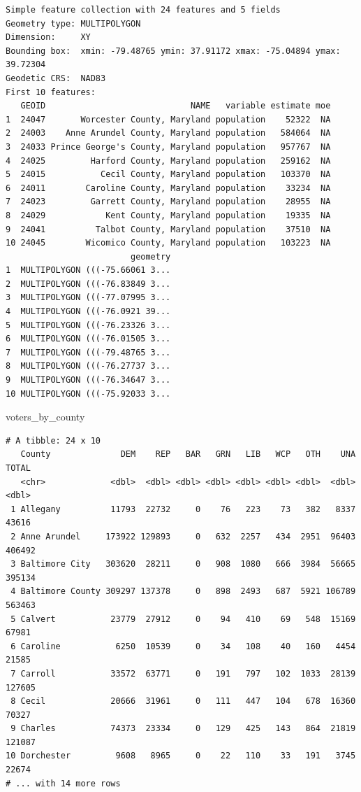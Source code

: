 \documentclass[
  letterpaper,
  DIV=11,
  numbers=noendperiod]{scrreprt}
\newenvironment{Shaded}{\begin{snugshade}}{\end{snugshade}}
\newcommand{\NormalTok}[1]{\textcolor[rgb]{0.00,0.23,0.31}{#1}}
\begin{document}
\begin{verbatim}
Simple feature collection with 24 features and 5 fields
Geometry type: MULTIPOLYGON
Dimension:     XY
Bounding box:  xmin: -79.48765 ymin: 37.91172 xmax: -75.04894 ymax: 39.72304
Geodetic CRS:  NAD83
First 10 features:
   GEOID                             NAME   variable estimate moe
1  24047       Worcester County, Maryland population    52322  NA
2  24003    Anne Arundel County, Maryland population   584064  NA
3  24033 Prince George's County, Maryland population   957767  NA
4  24025         Harford County, Maryland population   259162  NA
5  24015           Cecil County, Maryland population   103370  NA
6  24011        Caroline County, Maryland population    33234  NA
7  24023         Garrett County, Maryland population    28955  NA
8  24029            Kent County, Maryland population    19335  NA
9  24041          Talbot County, Maryland population    37510  NA
10 24045        Wicomico County, Maryland population   103223  NA
                         geometry
1  MULTIPOLYGON (((-75.66061 3...
2  MULTIPOLYGON (((-76.83849 3...
3  MULTIPOLYGON (((-77.07995 3...
4  MULTIPOLYGON (((-76.0921 39...
5  MULTIPOLYGON (((-76.23326 3...
6  MULTIPOLYGON (((-76.01505 3...
7  MULTIPOLYGON (((-79.48765 3...
8  MULTIPOLYGON (((-76.27737 3...
9  MULTIPOLYGON (((-76.34647 3...
10 MULTIPOLYGON (((-75.92033 3...
\end{verbatim}

\begin{Shaded}
\begin{Highlighting}[]
\NormalTok{voters\_by\_county}
\end{Highlighting}
\end{Shaded}

\begin{verbatim}
# A tibble: 24 x 10
   County              DEM    REP   BAR   GRN   LIB   WCP   OTH    UNA  TOTAL
   <chr>             <dbl>  <dbl> <dbl> <dbl> <dbl> <dbl> <dbl>  <dbl>  <dbl>
 1 Allegany          11793  22732     0    76   223    73   382   8337  43616
 2 Anne Arundel     173922 129893     0   632  2257   434  2951  96403 406492
 3 Baltimore City   303620  28211     0   908  1080   666  3984  56665 395134
 4 Baltimore County 309297 137378     0   898  2493   687  5921 106789 563463
 5 Calvert           23779  27912     0    94   410    69   548  15169  67981
 6 Caroline           6250  10539     0    34   108    40   160   4454  21585
 7 Carroll           33572  63771     0   191   797   102  1033  28139 127605
 8 Cecil             20666  31961     0   111   447   104   678  16360  70327
 9 Charles           74373  23334     0   129   425   143   864  21819 121087
10 Dorchester         9608   8965     0    22   110    33   191   3745  22674
# ... with 14 more rows
\end{verbatim}
\end{document}
